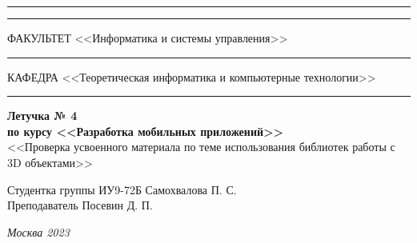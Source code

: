 \documentclass[a4paper, 14pt]{extarticle}
\begin{document}
\begin{titlepage}
\vspace{-25pt}
\hspace{-35pt}\rule{\textwidth}{2.3pt}

\vspace*{-20.3pt}
\hspace{-35pt}\rule{\textwidth}{0.4pt}

\vspace{1.5ex}
\hspace{-35pt} \noindent \small ФАКУЛЬТЕТ\hspace{80pt} <<Информатика и системы управления>>

\vspace*{-16pt}
\hspace{47pt}\rule{0.83\textwidth}{0.4pt}

\vspace{0.5ex}
\hspace{-35pt} \noindent \small КАФЕДРА\hspace{50pt} <<Теоретическая информатика и компьютерные технологии>>

\vspace*{-16pt}
\hspace{30pt}\rule{0.866\textwidth}{0.4pt}
  
\vspace{11em}

\begin{center}
\Large {\bf Летучка № 4} \\
\large {\bf по курсу <<Разработка мобильных приложений>>} \\
\large <<Проверка усвоенного материала по теме использования библиотек  работы с 3D объектами>>
\end{center}\normalsize

\vspace{8em}


\begin{flushright}
  {Студентка группы ИУ9-72Б Самохвалова П. С. \hspace*{15pt}\\
  \vspace{2ex}
  Преподаватель Посевин Д. П.\hspace*{15pt}}
\end{flushright}

\bigskip

\vfill
 

\begin{center}
\textsl{Москва 2023}
\end{center}
\end{titlepage}
\end{document}
